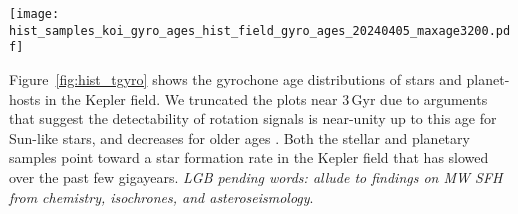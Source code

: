 \documentclass[11pt,twocolumn,tighten]{aastex63}
\begin{document}
\begin{figure*}[!t]
	\begin{center}
		\leavevmode
		\texttt{[image: hist\_samples\_koi\_gyro\_ages\_hist\_field\_gyro\_ages\_20240405\_maxage3200.pdf]}
	\end{center}
	\vspace{-0.6cm}
	\caption{
		{\bf Age distribution of stars and planet-hosts in the Kepler field
    inferred from rotation periods}.
    A histogram of samples from the age posteriors for all Kepler
    stars with reported rotation periods and temperatures is shown in
    light gray;
    the age calculation was actually valid for stars that meet the criteria
    discussed in Section~\ref{subsec:flags} (dark blue).
		\label{fig:hist_tgyro}
	}
\end{figure*}

Figure~\ref{fig:hist_tgyro} shows the gyrochone age distributions of
stars and planet-hosts in the Kepler field.
We truncated the plots near $3$\,Gyr due to arguments that suggest the
detectability of rotation signals is near-unity up to this age for
Sun-like stars, and decreases for older ages
\citep{2022ApJ...937...94M}.
Both the stellar and planetary samples point toward a star formation
rate in the Kepler field that has slowed over the past few gigayears.
{\it LGB pending words: allude to findings on MW SFH from chemistry,
isochrones, and asteroseismology}.

%
\end{document}

